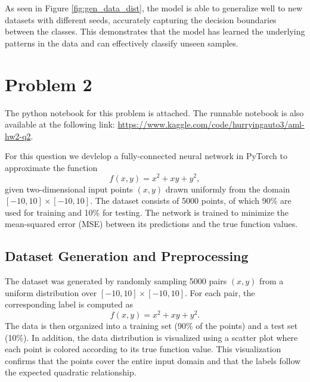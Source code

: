 \documentclass{article}
\begin{document}
As seen in Figure \ref{fig:gen_data_dist}, the model is able to generalize well to new datasets with different seeds, accurately capturing the decision boundaries between the classes. This demonstrates that the model has learned the underlying patterns in the data and can effectively classify unseen samples.

\newpage
\section*{Problem 2}
The python notebook for this problem is attached. The runnable notebook is also available at the following link: \url{https://www.kaggle.com/code/hurryingauto3/aml-hw2-q2}.

For this question we devlelop a fully-connected neural network in PyTorch to approximate the function
\[
f(x, y) = x^2 + xy + y^2,
\]
given two-dimensional input points $(x, y)$ drawn uniformly from the domain $[-10,10] \times [-10,10]$. The dataset consists of 5000 points, of which 90\% are used for training and 10\% for testing. The network is trained to minimize the mean-squared error (MSE) between its predictions and the true function values.

\subsection*{Dataset Generation and Preprocessing}
The dataset was generated by randomly sampling 5000 pairs $(x, y)$ from a uniform distribution over $[-10,10] \times [-10,10]$. For each pair, the corresponding label is computed as 
\[
f(x, y) = x^2 + xy + y^2.
\]
The data is then organized into a training set (90\% of the points) and a test set (10\%). In addition, the data distribution is visualized using a scatter plot where each point is colored according to its true function value. This visualization confirms that the points cover the entire input domain and that the labels follow the expected quadratic relationship.
\end{document}
